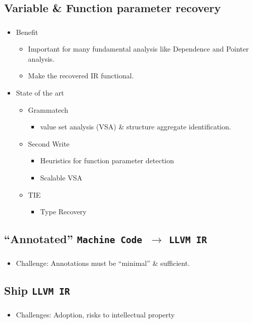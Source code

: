 \documentclass[mathserif,10pt]{beamer}
\newcommand{\LIR}{{\tt LLVM IR}}
\newcommand{\MC}{{\tt Machine Code}}
\begin{document}
  \subsection{Variable \& Function parameter recovery}
  \frame
  {
    \frametitle{\subsecname}
    \begin{itemize}
      \item Benefit
        \begin{itemize}
          \item Important for many fundamental analysis like Dependence and Pointer analysis.
          \item Make the recovered IR functional. 
        \end{itemize}
      \item State of the art
        \begin{itemize}
          \item Grammatech
            \begin{itemize}
              \item value set analysis (VSA) \& structure aggregate identification.
            \end{itemize}     
          \item Second Write 
            \begin{itemize}
              \item Heuristics for function parameter detection
              \item Scalable VSA
            \end{itemize}     
          \item TIE
            \begin{itemize}
              \item Type Recovery
            \end{itemize}     
        \end{itemize}
    \end{itemize}

  }

  \subsection{``Annotated'' \MC \ $\rightarrow$ \LIR}
  \frame
  {
    \frametitle{\subsecname}
    \begin{itemize}
      \item Challenge: Annotations must be ``minimal'' \& sufficient.
    \end{itemize}
  }

  \subsection{Ship \LIR}
  \frame
  {
    \frametitle{\subsecname}
    \begin{itemize}
      \item Challenges: Adoption, risks to intellectual property
    \end{itemize}
  }
\end{document}

